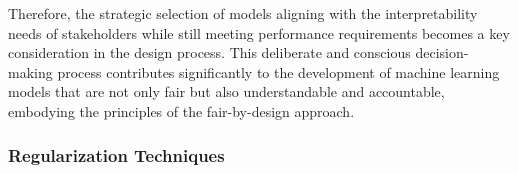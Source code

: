 \documentclass[12pt,a4paper,openright,twoside]{book}
\begin{document}
\begin{itemize}
\begin{itemize}
        Therefore, the strategic selection of models aligning with the interpretability needs of stakeholders while still meeting performance requirements becomes a key consideration in the design process. This deliberate and conscious decision-making process contributes significantly to the development of machine learning models that are not only fair but also understandable and accountable, embodying the principles of the fair-by-design approach.

    \end{itemize}

\end{itemize}

\subsubsection{Regularization Techniques}
\end{document}
